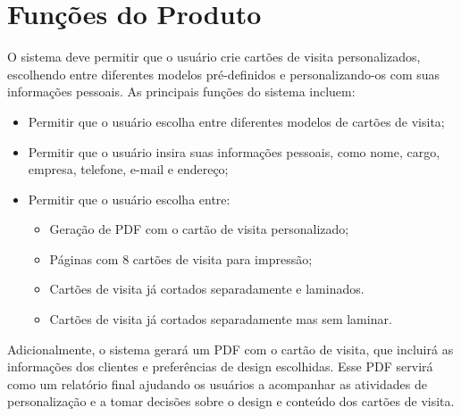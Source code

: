 \section{Funções do Produto}

O sistema deve permitir que o usuário crie cartões de visita personalizados, escolhendo entre diferentes modelos pré-definidos e personalizando-os com suas informações pessoais. As principais funções do sistema incluem:

\begin{itemize}
    \item Permitir que o usuário escolha entre diferentes modelos de cartões de visita;
    \item Permitir que o usuário insira suas informações pessoais, como nome, cargo, empresa, telefone, e-mail e endereço;
    \item Permitir que o usuário escolha entre:
        \begin{itemize}
            \item Geração de PDF com o cartão de visita personalizado;
            \item Páginas com 8 cartões de visita para impressão;
            \item Cartões de visita já cortados separadamente e laminados.
            \item Cartões de visita já cortados separadamente mas sem laminar.
        \end{itemize}
\end{itemize}

Adicionalmente, o sistema gerará um PDF com o cartão de visita, que incluirá as informações dos clientes e preferências de design escolhidas. Esse PDF servirá como um relatório final ajudando os usuários a acompanhar as atividades de personalização e a tomar decisões sobre o design e conteúdo dos cartões de visita.
